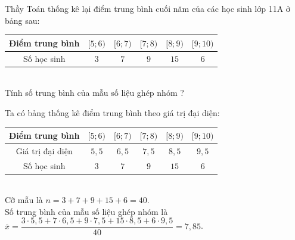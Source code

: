 \begin{bt}%
	Thầy Toán thống kê lại điểm trung bình cuối năm của các học sinh lớp 11A ở bảng sau:\\
	\begin{tabular}{|c|c|c|c|c| c|}
		\hline
		Điểm trung bình & $[5;6)$  & $[6;7)$  & $[7;8)$ & $[8;9)$  & $[9;10)$  \\
		\hline
		Số học sinh & $3$  & $7$ & $9$ & $15$ & $6$   \\
		\hline
	\end{tabular}\\
	Tính số trung bình của mẫu số liệu ghép nhóm ?
	\loigiai
	{
		Ta có bảng thống kê điểm trung bình theo giá trị đại diện:\\
		\begin{tabular}{|c|c|c|c|c| c|}
			\hline
			Điểm trung bình & $[5;6)$  & $[6;7)$  & $[7;8)$ & $[8;9)$  & $[9;10)$  \\
			\hline
			Giá trị đại diện & $5{,}5$  & $6{,}5$  & $7{,}5$  & $8{,}5$  & $9{,}5$     \\
			\hline
			Số học sinh & $3$  & $7$ & $9$ & $15$ & $6$   \\
			\hline
		\end{tabular}\\
		Cỡ mẫu là $n = 3 + 7 + 9 + 15 + 6 = 40$. \\
		Số trung bình của mẫu số liệu ghép nhóm là\\
		$\overline x  = \dfrac{{3\cdot 5{,}5 + 7\cdot 6{,}5 + 9\cdot 7{,}5 + 15\cdot 8{,}5 + 6\cdot 9{,}5}}{{40}} = 7{,}85$. 
		
	}
\end{bt}

